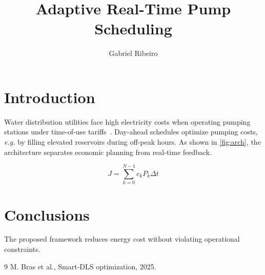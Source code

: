 \documentclass[11pt]{article}
\title{Adaptive Real-Time Pump Scheduling}
\author{Gabriel Ribeiro}
\begin{document}
\maketitle

\section{Introduction}
Water distribution utilities face high electricity costs when operating pumping stations under time-of-use tariffs~\cite{bras2025}.
Day-ahead schedules optimize pumping costs, \textit{e.g.} by filling elevated reservoirs during off-peak hours.
As shown in \autoref{fig:arch}, the architecture separates economic planning from real-time feedback.

\begin{equation}
J = \sum_{k=0}^{N-1} c_k P_k \Delta t
\end{equation}



\section{Conclusions}
The proposed framework reduces energy cost without violating operational constraints.

\begin{thebibliography}{9}
 M. Bras et al., Smart-DLS optimization, 2025.
\end{thebibliography}
\end{document}
